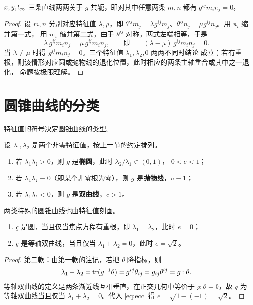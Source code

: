\begin{proposition}[主轴两两共轭]
$x,y,l_{\infty}$ 三条直线两两关于 $g$ 共轭，即对其中任意两条 $m,n$ 都有
$g^{ij}m_in_j=0$。
\end{proposition}

\begin{proof}
设 $m,n$ 分别对应特征值 $\lambda,\mu$，即
$\theta^{ij}m_j=\lambda g^{ij}m_j$、$\theta^{ij}n_j=\mu g^{ij}n_j$。用 $n_i$ 缩并第一式，
用 $m_i$ 缩并第二式，由于 $\theta^{ij}$ 对称，两式左端相等，于是
\[
\lambda\,g^{ij}m_in_j=\mu\,g^{ij}m_in_j,
\qquad\text{即}\qquad
(\lambda-\mu)\,g^{ij}m_in_j=0 .
\]
当 $\lambda\ne\mu$ 时得 $g^{ij}m_in_j=0$。三个特征值 $\lambda_1,\lambda_2,0$ 两两不同时结论
成立；若有重根，则该情形对应圆或抛物线的退化位置，此时相应的两条主轴重合或其中之一退化，
命题按极限理解。
\end{proof}

\section{圆锥曲线的分类}

特征值的符号决定圆锥曲线的类型。

\begin{proposition}[按特征值分类]
设 $\lambda_1,\lambda_2$ 是两个非零特征值，按上一节的约定排列。
\begin{enumerate}
\item 若 $\lambda_1\lambda_2>0$，则 $g$ 是\textbf{椭圆}，此时 $\lambda_2/\lambda_1\in(0,1)$，
$0<e<1$；
\item 若 $\lambda_1\lambda_2=0$（即某个非零根为零），则 $g$ 是\textbf{抛物线}，$e=1$；
\item 若 $\lambda_1\lambda_2<0$，则 $g$ 是\textbf{双曲线}，$e>1$。
\end{enumerate}
\end{proposition}

两类特殊的圆锥曲线也由特征值刻画。

\begin{proposition}[圆与等轴双曲线]
\begin{enumerate}
\item $g$ 是圆，当且仅当焦点方程有重根，即 $\lambda_1=\lambda_2$，此时 $e=0$；
\item $g$ 是等轴双曲线，当且仅当 $\lambda_1+\lambda_2=0$，此时 $e=\sqrt2$。
\end{enumerate}
\end{proposition}

\begin{proof}
第二款：由第一款的注记，若把 $\theta$ 降指标，则
\[
\lambda_1+\lambda_2=\operatorname{tr}(g^{-1}\theta)=g^{ij}\theta_{ij}=g_{ij}\theta^{ij}=g:\theta .
\]
等轴双曲线的定义是两条渐近线互相垂直，在正交几何中等价于 $g:\theta=0$，故
$g$ 为等轴双曲线当且仅当 $\lambda_1+\lambda_2=0$。代入 \eqref{eq:ecc} 得
$e=\sqrt{1-(-1)}=\sqrt2$。
\end{proof}

